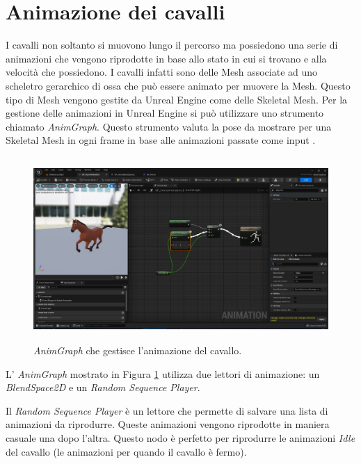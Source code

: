     \section{Animazione dei cavalli}

    I cavalli non soltanto si muovono lungo il percorso ma possiedono una serie di animazioni che vengono riprodotte in base allo stato in cui si trovano e alla velocità che possiedono.
    I cavalli infatti sono delle Mesh associate ad uno scheletro gerarchico di ossa che può essere animato per muovere la Mesh.
    Questo tipo di Mesh vengono gestite da Unreal Engine come delle Skeletal Mesh. 
    Per la gestione delle animazioni in Unreal Engine si può utilizzare uno strumento chiamato \textit{AnimGraph}.
    Questo strumento valuta la pose da mostrare per una Skeletal Mesh in ogni frame in base alle animazioni passate come input \cite{UAnimGraph}.

    \begin{figure}[!ht]
        \centering
        \includegraphics[height=7cm]{figure/HorseAnimGraph.JPG}
        \caption{\textit{AnimGraph} che gestisce l'animazione del cavallo.}
        \label{fig:AnimGraph}
    \end{figure}

    L' \textit{AnimGraph} mostrato in Figura \ref{fig:AnimGraph} utilizza due lettori di animazione: un \textit{BlendSpace2D} e un \textit{Random Sequence Player}.
    
    Il \textit{Random Sequence Player} è un lettore che permette di salvare una lista di animazioni da riprodurre.
    Queste animazioni vengono riprodotte in maniera casuale una dopo l'altra.
    Questo nodo è perfetto per riprodurre le animazioni \textit{Idle} del cavallo (le animazioni per quando il cavallo è fermo).

